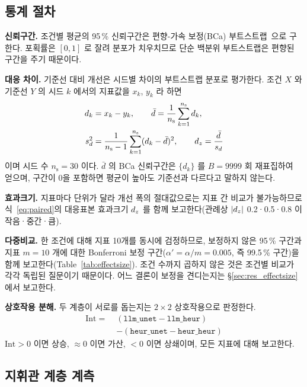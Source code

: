 \subsection{통계 절차}
\label{sec:stats}

\textbf{신뢰구간.} 조건별 평균의 95\,\% 신뢰구간은 편향-가속 보정(BCa)
부트스트랩~\citep{efron1993bootstrap, diciccio1996bca}으로 구한다. 포획률은 $[0,1]$ 로 잘려
분포가 치우치므로 단순 백분위 부트스트랩은 편향된 구간을 주기 때문이다.

\textbf{대응 차이.} 기준선 대비 개선은 시드별 차이의 부트스트랩 분포로 평가한다. 조건
$X$ 와 기준선 $Y$ 의 시드 $k$ 에서의 지표값을 $x_k$, $y_k$ 라 하면
\begin{equation}
\begin{aligned}
d_k &= x_k - y_k, \qquad \bar{d} = \frac{1}{n_{\mathrm{s}}}\sum_{k=1}^{n_{\mathrm{s}}} d_k,\\
s_d^2 &= \frac{1}{n_{\mathrm{s}}-1}\sum_{k=1}^{n_{\mathrm{s}}} (d_k - \bar{d})^2, \qquad
d_z = \frac{\bar{d}}{s_d}
\end{aligned}
\label{eq:paired}
\end{equation}
이며 시드 수 $n_{\mathrm{s}} = 30$ 이다. $\bar{d}$ 의 BCa 신뢰구간은 $\{d_k\}$ 를 $B = 9999$ 회
재표집하여 얻으며, 구간이 0을 포함하면 평균이 높아도 기준선과 다르다고 말하지 않는다.

\textbf{효과크기.} 지표마다 단위가 달라 개선 폭의 절대값으로는 지표 간 비교가 불가능하므로
식~\eqref{eq:paired}의 대응표본 효과크기 $d_z$ 를 함께 보고한다(관례상 $|d_z|$ 0.2·0.5·0.8
이 작음·중간·큼).

\textbf{다중비교.} 한 조건에 대해 지표 10개를 동시에 검정하므로, 보정하지 않은 95\,\%
구간과 지표 $m = 10$ 개에 대한 Bonferroni 보정 구간($\alpha' = \alpha / m = 0.005$, 즉
99.5\,\% 구간)을 함께 보고한다(Table~\ref{tab:effectsize}). 조건 수까지 곱하지 않은 것은
조건별 비교가 각각 독립된 질문이기 때문이다. 어느 결론이 보정을 견디는지는
\S\ref{sec:res_effectsize}에서 보고한다.

\textbf{상호작용 분해.} 두 계층이 서로를 돕는지는 $2\times2$ 상호작용으로 판정한다.
\begin{align}
\mathrm{Int} =\;& (\texttt{llm\_unet} - \texttt{llm\_heur}) \nonumber\\
                &- (\texttt{heur\_unet} - \texttt{heur\_heur})
\label{eq:interaction}
\end{align}
$\mathrm{Int} > 0$ 이면 상승, $\approx 0$ 이면 가산, $< 0$ 이면 상쇄이며, 모든 지표에 대해
보고한다.

\subsection{지휘관 계층 계측}

